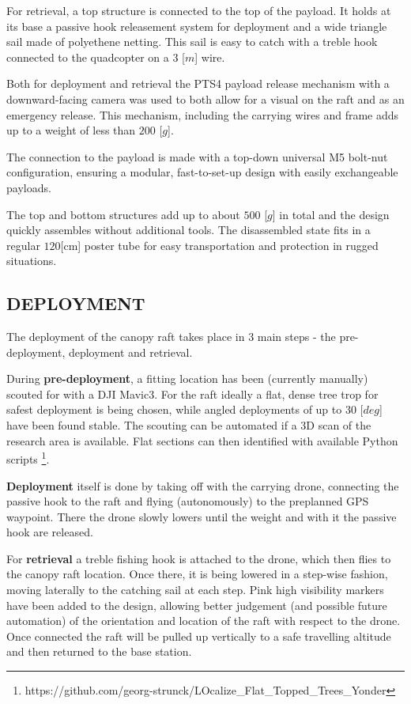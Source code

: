 For retrieval, a top structure is connected to the top of the payload. It holds at its base a passive hook releasement system for deployment and a wide triangle sail made of polyethene netting. This sail is easy to catch with a treble hook connected to the quadcopter on a $3$ [$m$] wire. 

Both for deployment and retrieval the PTS4 payload release mechanism with a downward-facing camera was used to both allow for a visual on the raft and as an emergency release. This mechanism, including the carrying wires and frame adds up to a weight of less than $200$ [$g$].

The connection to the payload is made with a top-down universal M5 bolt-nut configuration, ensuring a modular, fast-to-set-up design with easily exchangeable payloads.

The top and bottom structures add up to about $500$ [$g$] in total and the design quickly assembles without additional tools. The disassembled state fits in a regular $120$[cm] poster tube for easy transportation and protection in rugged situations.

    \subsection{DEPLOYMENT}
The deployment of the canopy raft takes place in 3 main steps - the pre-deployment, deployment and retrieval.

During \textbf{pre-deployment}, a fitting location has been (currently manually) scouted for with a DJI Mavic3. For the raft ideally a flat, dense tree trop for safest deployment is being chosen, while angled deployments of up to $30$ [$deg$] have been found stable. The scouting can be automated if a 3D scan of the research area is available. Flat sections can then identified with available Python scripts \footnote{https://github.com/georg-strunck/LOcalize\_Flat\_Topped\_Trees\_Yonder}.

\textbf{Deployment} itself is done by taking off with the carrying drone, connecting the passive hook to the raft and flying (autonomously) to the preplanned GPS waypoint. There the drone slowly lowers until the weight and with it the passive hook are released.

For \textbf{retrieval} a treble fishing hook is attached to the drone, which then flies to the canopy raft location. Once there, it is being lowered in a step-wise fashion, moving laterally to the catching sail at each step. Pink high visibility markers have been added to the design, allowing better judgement (and possible future automation) of the orientation and location of the raft with respect to the drone. Once connected the raft will be pulled up vertically to a safe travelling altitude and then returned to the base station.

